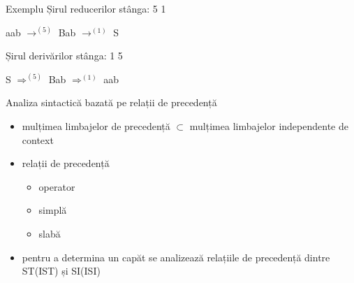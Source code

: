 \documentclass[pdf]{beamer}
\begin{document}
\begin{frame}{Exemplu}
Șirul reducerilor stânga: 5 1 

aab $\rightarrow^{(5)}$ Bab  $\rightarrow^{(1)}$ S 
\newline

Șirul derivărilor stânga: 1 5 

S $\Rightarrow^{(5)}$ Bab  $\Rightarrow^{(1)}$ aab 
\end{frame}



\begin{frame}{Analiza sintactică bazată pe relații de precedență}

\begin{itemize}
	\item 
	mulțimea limbajelor de precedență \( \subset \) mulțimea limbajelor independente de context

	\item 
	relații de precedență 
	  
	
	\begin{itemize}
		\item
		operator
		
		\item
		simplă
		
		\item
		slabă	
	\end{itemize}
		
	\item 
	pentru a determina un capăt se analizează relațiile de precedență dintre ST(IST) și SI(ISI)
	
\end{itemize}


\end{frame}
\end{document}
